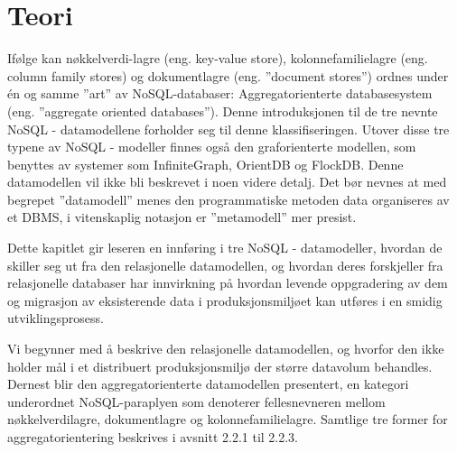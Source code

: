 
\chapter{Teori}
Ifølge \cite{sadalage2013} kan nøkkelverdi-lagre (eng. key-value store), kolonnefamilielagre (eng. column family stores) og dokumentlagre (eng. ''document stores'') ordnes under én og samme ''art'' av NoSQL-databaser: Aggregatorienterte databasesystem (eng. ''aggregate oriented databases''). Denne introduksjonen til de tre nevnte NoSQL - datamodellene forholder seg til denne klassifiseringen. Utover disse tre typene av NoSQL - modeller finnes også den graforienterte modellen, som benyttes av systemer som InfiniteGraph, OrientDB og FlockDB. Denne datamodellen vil ikke bli beskrevet i noen videre detalj. Det bør nevnes at med begrepet ''datamodell'' menes den programmatiske metoden data organiseres av et DBMS, i vitenskaplig notasjon er ''metamodell'' mer presist.

Dette kapitlet gir leseren en innføring i tre NoSQL - datamodeller, hvordan de skiller seg ut fra den relasjonelle datamodellen, og hvordan deres forskjeller fra relasjonelle databaser har innvirkning på hvordan levende oppgradering av dem og migrasjon av eksisterende data i produksjonsmiljøet kan utføres i en smidig utviklingsprosess.

Vi begynner med å beskrive den relasjonelle datamodellen, og hvorfor den ikke holder mål i et distribuert produksjonsmiljø der større datavolum behandles. Dernest blir den aggregatorienterte datamodellen presentert, en kategori underordnet NoSQL-paraplyen som denoterer fellesnevneren mellom nøkkelverdilagre, dokumentlagre og kolonnefamilielagre. Samtlige tre former for aggregatorientering beskrives i avsnitt 2.2.1 til 2.2.3.








\cleardoublepage


